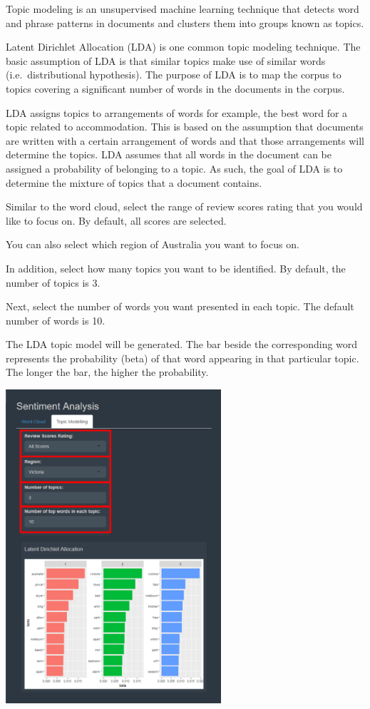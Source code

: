 \documentclass[
]{article}
\begin{document}
Topic modeling is an unsupervised machine learning technique that
detects word and phrase patterns in documents and clusters them into
groups known as topics.

Latent Dirichlet Allocation (LDA) is one common topic modeling
technique. The basic assumption of LDA is that similar topics make use
of similar words (i.e.~distributional hypothesis). The purpose of LDA is
to map the corpus to topics covering a significant number of words in
the documents in the corpus.

LDA assigns topics to arrangements of words for example, the best word
for a topic related to accommodation. This is based on the assumption
that documents are written with a certain arrangement of words and that
those arrangements will determine the topics. LDA assumes that all words
in the document can be assigned a probability of belonging to a topic.
As such, the goal of LDA is to determine the mixture of topics that a
document contains.

Similar to the word cloud, select the range of review scores rating that
you would like to focus on. By default, all scores are selected.

You can also select which region of Australia you want to focus on.

In addition, select how many topics you want to be identified. By
default, the number of topics is 3.

Next, select the number of words you want presented in each topic. The
default number of words is 10.

The LDA topic model will be generated. The bar beside the corresponding
word represents the probability (beta) of that word appearing in that
particular topic. The longer the bar, the higher the probability.

\includegraphics[width=0.6\textwidth,height=\textheight]{images/topicmodel1.png}
\end{document}
